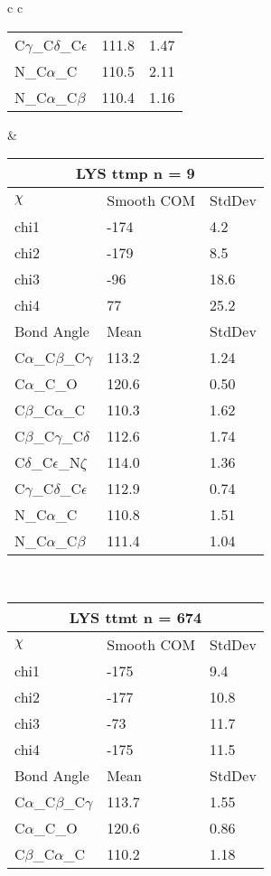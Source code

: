 \begin{longtable}{ c c }
\begin{tabular}{ l l l }
  C$\gamma$\_C$\delta$\_C$\epsilon$ & 111.8 & 1.47\\
  N\_C$\alpha$\_C & 110.5 & 2.11\\
  N\_C$\alpha$\_C$\beta$ & 110.4 & 1.16\\
  \bottomrule
  \end{tabular}
  &
  \begin{tabular}{ l l l }
  \toprule
  \multicolumn{3}{c}{LYS \textbf{ttmp} n = 9} \\ \toprule
  $\chi$       & Smooth COM & StdDev \\ \midrule
  chi1 & -174 & 4.2 \\ 
  chi2 & -179 & 8.5 \\ 
  chi3 & -96 & 18.6 \\ 
  chi4 & 77 & 25.2 \\ \midrule
  Bond Angle   & Mean     & StdDev \\ \midrule
  C$\alpha$\_C$\beta$\_C$\gamma$ & 113.2 & 1.24\\
  C$\alpha$\_C\_O & 120.6 & 0.50\\
  C$\beta$\_C$\alpha$\_C & 110.3 & 1.62\\
  C$\beta$\_C$\gamma$\_C$\delta$ & 112.6 & 1.74\\
  C$\delta$\_C$\epsilon$\_N$\zeta$ & 114.0 & 1.36\\
  C$\gamma$\_C$\delta$\_C$\epsilon$ & 112.9 & 0.74\\
  N\_C$\alpha$\_C & 110.8 & 1.51\\
  N\_C$\alpha$\_C$\beta$ & 111.4 & 1.04\\
  \bottomrule
  \end{tabular}
  \\
  \begin{tabular}{ l l l }
  \toprule
  \multicolumn{3}{c}{LYS \textbf{ttmt} n = 674} \\ \toprule
  $\chi$       & Smooth COM & StdDev \\ \midrule
  chi1 & -175 & 9.4 \\ 
  chi2 & -177 & 10.8 \\ 
  chi3 & -73 & 11.7 \\ 
  chi4 & -175 & 11.5 \\ \midrule
  Bond Angle   & Mean     & StdDev \\ \midrule
  C$\alpha$\_C$\beta$\_C$\gamma$ & 113.7 & 1.55\\
  C$\alpha$\_C\_O & 120.6 & 0.86\\
  C$\beta$\_C$\alpha$\_C & 110.2 & 1.18\\

\end{tabular}
\end{longtable}

